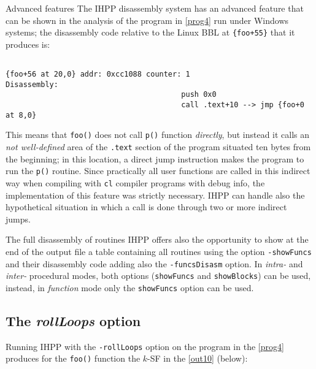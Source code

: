 \documentclass[a4paper,10pt]{report}
\begin{document}
\begin{paragraph}{Advanced features}
The IHPP disassembly system has an advanced feature that can be shown in
the analysis of the program in \cref{prog4} run under Windows systems;
the disassembly code relative
to the Linux BBL at \verb|{foo+55}| that it produces is:
\begin{lstlisting}[language={[x86masm]Assembler},
	label=out92, caption={an example of a two-step call}, frame=bottomline]

{foo+56 at 20,0} addr: 0xcc1088 counter: 1
Disassembly:
										push 0x0
										call .text+10 --> jmp {foo+0 at 8,0}
\end{lstlisting}

This means that \verb|foo()| does not call \verb|p()| function \emph{directly},
but instead it calls an \emph{not well-defined}
area of the \verb|.text| section of the program
situated ten bytes from the beginning; in this location, a direct jump instruction
makes the program to run the \verb|p()| routine. Since practically all user functions
are called in this indirect way when compiling with \verb|cl| compiler
programs with debug info, the implementation
of this feature was strictly necessary. IHPP can handle also
the hypothetical situation in which a call is done through two or more indirect jumps.
\end{paragraph}

\begin{paragraph}{The full disassembly of routines}
IHPP offers also the opportunity to show at the end of the output file
a table containing all routines using the option \verb|-showFuncs| and their
disassembly code adding also the \verb|-funcsDisasm| option.
In \emph{intra-} and \emph{inter-} procedural modes, both options (\verb|showFuncs| and \verb|showBlocks|) can be used, instead, in \emph{function} mode
only the \verb|showFuncs| option can be used.
\end{paragraph}

\subsection{The \emph{rollLoops} option}

Running IHPP with the \verb|-rollLoops| option on the program in the \cref{prog4}
produces for the \verb|foo()| function the $k$-SF in the \cref{out10} (below):
\end{document}
